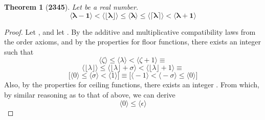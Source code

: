 \documentclass[preview]{standalone}
\newtheorem*{theorem*}{Theorem}
\begin{document}
\begin{theorem*}[\textbf{2345}]
    Let \bm{$\lambda$} be a real number. 
    \begin{equation*}
        \bm{
            \big \langle \lambda - 1 \big \rangle
                < 
            \big \langle \lfloor \lambda \rfloor \big \rangle
                \leq 
            \big \langle \lambda \big \rangle
                \leq
            \big \langle \lceil \lambda \rceil \big \rangle
                <
            \big \langle \lambda + 1 \big \rangle
        }
    \end{equation*}
\end{theorem*}

\begin{proof}
    Let \bm{$\lambda - \lfloor \lambda \rfloor = \sigma$}, 
    and let \bm{$\lceil \lambda \rceil - \lambda = \epsilon$}.
    By the additive and multiplicative compatibility laws from the order axioms,
    and by the properties for floor functions,
    there exists an integer \bm{$\lfloor \lambda \rfloor = \zeta$} such that
    \begin{equation*}
        \Big \langle \zeta \Big \rangle 
            \leq 
        \Big \langle \lambda \Big \rangle
            <
        \Big \langle \zeta + 1 \Big \rangle
            \equiv
    \end{equation*}
    \begin{equation*}
        \Big \langle \lfloor \lambda \rfloor \Big \rangle
            \leq 
        \Big \langle \lfloor \lambda \rfloor + \sigma \Big \rangle 
            < 
        \Big \langle \lfloor \lambda \rfloor + 1 \Big \rangle
            \equiv
    \end{equation*}
    \begin{equation*}
        \bigg[
            \Big \langle 0 \Big \rangle 
                \leq 
            \Big \langle \sigma \Big \rangle 
                < 
            \Big \langle 1 \Big \rangle
        \bigg]
            \equiv
        \bigg[
            \Big \langle -1 \Big \rangle
                <
            \Big \langle - \sigma \Big \rangle
                \leq
            \Big \langle 0 \Big \rangle
        \bigg]
    \end{equation*}
    Also, by the properties for ceiling functions,
    there exists an integer \bm{$\lceil \lambda \rceil = \xi$}.
    From which, by similar reasoning as to that of above,
    we can derive
    \begin{equation*}
        \Big \langle 0 \Big \rangle
            \leq
        \Big \langle \epsilon \Big \rangle

\end{equation*}
\end{proof}
\end{document}
